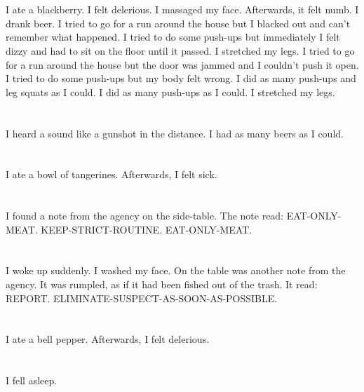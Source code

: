 \documentclass{article}
\begin{document}
    \section{}
    I ate a blackberry. I felt delerious. I massaged my face. Afterwards, it felt numb. I drank beer.  I tried to go for a run around the house but I blacked out and can't remember what happened.  I tried to do some push-ups but immediately I felt dizzy and had to sit on the floor until it passed.  I stretched my legs.  I tried to go for a run around the house but the door was jammed and I couldn't push it open.   I tried to do some push-ups but my body felt wrong.  I did as many push-ups and leg squats as I could.  I did as many push-ups as I could.  I stretched my legs.  
    \newpage
    
    \section{}
    I heard a sound like a gunshot in the distance. I had as many beers as I could.  
    \newpage
    
    \section{}
    I ate a bowl of tangerines. Afterwards, I felt sick.  
    \newpage
    
    \section{}
    I found a note from the agency on the side-table. The note read: EAT-ONLY-MEAT. KEEP-STRICT-ROUTINE. EAT-ONLY-MEAT.  
    \newpage
    
    \section{}
    I woke up suddenly. I washed my face. On the table was another note from the agency. It was rumpled, as if it had been fished out of the trash. It read: REPORT. ELIMINATE-SUSPECT-AS-SOON-AS-POSSIBLE.  
    \newpage
    
    \section{}
    I ate a bell pepper. Afterwards, I felt delerious.  
    \newpage
    
    \section{}
    I fell asleep.\\\\ 
    \newpage
    
\end{document}

